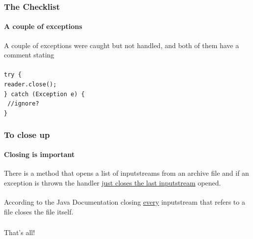 \documentclass[10pt,xcolor={usenames,dvipsnames}]{beamer}
\begin{document}
\begin{frame}
	\frametitle{The Checklist}
	\framesubtitle{A couple of exceptions}
	A couple of exceptions were caught but not handled, and both of them have a comment stating\\
	\-\\
	\texttt{{\color{Blue}try }\{\\\-	reader.close();\\\} {\color{Blue}catch} (Exception e) \{\\{\color{Green}\-	//ignore?}\\\}}
\end{frame}

\begin{frame}
	\frametitle{To close up}
	\framesubtitle{Closing is important}
	There is a method that opens a list of inputstreams from an archive file and if an exception is thrown the handler \underline{just closes the last inputstream} opened.\\
	\-\\
	According to the Java Documentation closing \underline{every} inputstream that refers to a file closes the file itself.\\
\end{frame}
\begin{frame}
	\frametitle{}
	\framesubtitle{}
	{\Huge
		\begin{center}
			That's all!
		\end{center}
	}
\end{frame}
\end{document}

